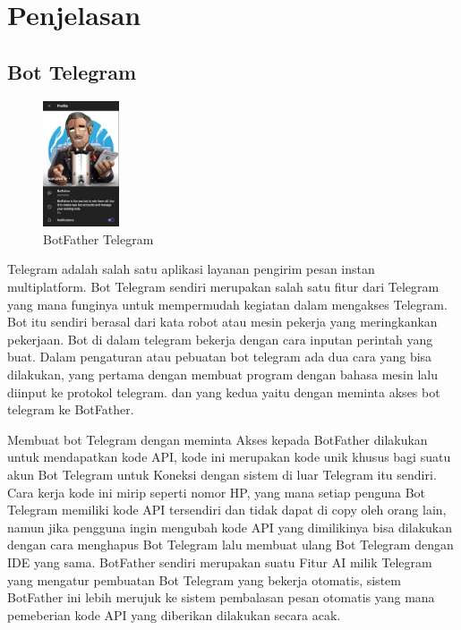 \documentclass[conference]{IEEEtran}
\begin{document}
\section{Penjelasan}
\subsection{Bot Telegram}
\vspace{0.2cm}
\begin{figure}[h]
    \centering
    \includegraphics[width=0.2\textwidth]{Botfather.png}
    \caption{BotFather Telegram}
\end{figure}

    Telegram adalah salah satu aplikasi layanan pengirim pesan instan multiplatform. Bot Telegram 
    sendiri merupakan salah satu fitur dari Telegram yang mana funginya untuk
    mempermudah kegiatan dalam mengakses Telegram. Bot itu sendiri
    berasal dari kata robot atau mesin pekerja yang meringkankan pekerjaan.
    Bot di dalam telegram bekerja dengan cara inputan perintah yang buat.
    Dalam pengaturan atau pebuatan bot telegram ada dua cara yang 
    bisa dilakukan, yang pertama dengan membuat program dengan bahasa
    mesin lalu diinput ke protokol telegram. dan yang kedua yaitu dengan
    meminta akses bot telegram ke BotFather.
   
    
        Membuat bot Telegram dengan meminta Akses kepada BotFather dilakukan untuk
    mendapatkan kode API, kode ini merupakan kode unik khusus bagi suatu
    akun Bot Telegram untuk Koneksi dengan sistem di luar Telegram itu
    sendiri. Cara kerja kode ini mirip seperti nomor HP, yang mana setiap
    penguna Bot Telegram memiliki kode API tersendiri dan tidak dapat di copy
    oleh orang lain, namun jika pengguna ingin mengubah kode API yang
    dimilikinya bisa dilakukan dengan cara menghapus Bot Telegram lalu
    membuat ulang Bot Telegram dengan IDE yang sama.
    BotFather sendiri merupakan suatu Fitur AI milik Telegram yang
    mengatur pembuatan Bot Telegram yang bekerja otomatis, sistem
    BotFather ini lebih merujuk ke sistem pembalasan pesan otomatis yang
    mana pemeberian kode API yang diberikan dilakukan secara acak.
\end{document}
